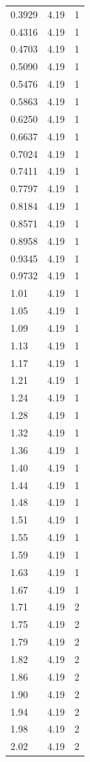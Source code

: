 \begin{longtable}{lrr}
  0.3929 & 4.19 & 1 \\
  0.4316 & 4.19 & 1 \\
  0.4703 & 4.19 & 1 \\
  0.5090 & 4.19 & 1 \\
  0.5476 & 4.19 & 1 \\
  0.5863 & 4.19 & 1 \\
  0.6250 & 4.19 & 1 \\
  0.6637 & 4.19 & 1 \\
  0.7024 & 4.19 & 1 \\
  0.7411 & 4.19 & 1 \\
  0.7797 & 4.19 & 1 \\
  0.8184 & 4.19 & 1 \\
  0.8571 & 4.19 & 1 \\
  0.8958 & 4.19 & 1 \\
  0.9345 & 4.19 & 1 \\
  0.9732 & 4.19 & 1 \\
  1.01 & 4.19 & 1 \\
  1.05 & 4.19 & 1 \\
  1.09 & 4.19 & 1 \\
  1.13 & 4.19 & 1 \\
  1.17 & 4.19 & 1 \\
  1.21 & 4.19 & 1 \\
  1.24 & 4.19 & 1 \\
  1.28 & 4.19 & 1 \\
  1.32 & 4.19 & 1 \\
  1.36 & 4.19 & 1 \\
  1.40 & 4.19 & 1 \\
  1.44 & 4.19 & 1 \\
  1.48 & 4.19 & 1 \\
  1.51 & 4.19 & 1 \\
  1.55 & 4.19 & 1 \\
  1.59 & 4.19 & 1 \\
  1.63 & 4.19 & 1 \\
  1.67 & 4.19 & 1 \\
  1.71 & 4.19 & 2 \\
  1.75 & 4.19 & 2 \\
  1.79 & 4.19 & 2 \\
  1.82 & 4.19 & 2 \\
  1.86 & 4.19 & 2 \\
  1.90 & 4.19 & 2 \\
  1.94 & 4.19 & 2 \\
  1.98 & 4.19 & 2 \\
  2.02 & 4.19 & 2 \\

\end{longtable}
